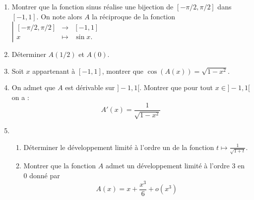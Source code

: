 \documentclass[a4paper, 11pt,reqno]{article}
\begin{document}
\vspace{1cm}
\begin{exercice}

\noindent

\begin{enumerate}
\item  Montrer que la fonction sinus réalise une bijection de $[-\pi / 2, \pi / 2]$ dans $[-1,1]$. On note alors $A$ la réciproque de la fonction 
$\left|\begin{array}{ccc}
[-\pi / 2, \pi / 2] &\rightarrow& [-1,1]\\
x &\longmapsto &\sin x.
\end{array}\right.$


\item Déterminer $A(1 / 2)$ et $A(0)$.
\item  Soit $x$ appartenant à $[-1,1]$, montrer que $\cos (A(x))=\sqrt{1-x^{2}}$.
\item On admet que $A$ est dérivable sur $]-1,1[$. Montrer que pour tout $x\in]-1,1[$ on a :
$$A'(x) =\frac{1}{\sqrt{1-x^2}}$$
\item 
\begin{enumerate}
\item Déterminer le développement limité à l'ordre un de la fonction $t \mapsto \frac{1}{\sqrt{1+t}}$.
\item Montrer que la fonction $A$ admet un développement limité à l'ordre 3 en 0 donné par
$$
A(x)=x+\frac{x^{3}}{6}+o\left(x^{3}\right)
$$
\end{enumerate}

\end{enumerate}


\end{exercice}
\end{document}

